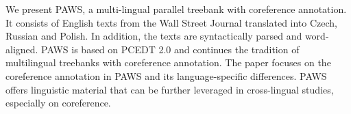 We present PAWS, a multi-lingual parallel treebank with coreference annotation. It consists of English texts from the Wall Street Journal translated into Czech, Russian and Polish. In addition, the texts are syntactically parsed and word-aligned. PAWS is based on PCEDT 2.0 and continues the tradition of multilingual treebanks with coreference annotation. The paper focuses on the coreference annotation in PAWS and its language-specific differences. PAWS offers linguistic material that can be further leveraged in cross-lingual studies, especially on coreference.
